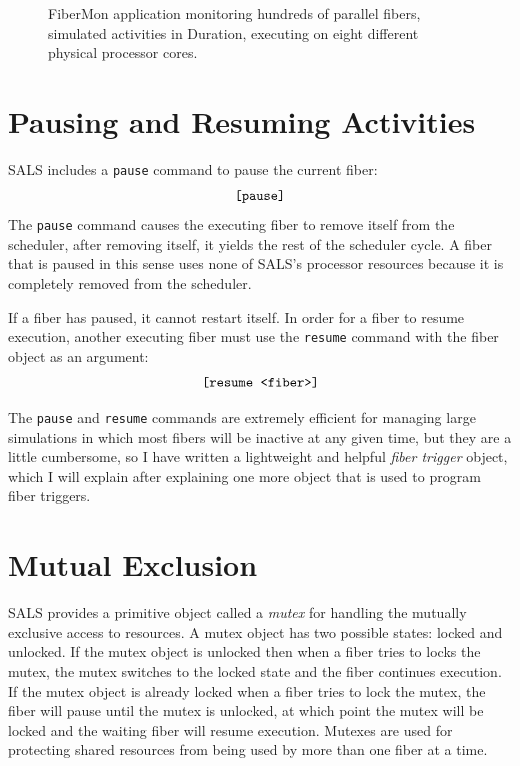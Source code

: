 \begin{figure}[bth]
  \caption[FiberMon application monitoring many fibers]{FiberMon
    application monitoring hundreds of parallel fibers, simulated
    activities in Duration, executing on eight different physical
    processor cores.}
  \label{figure:fibermon_many_fibers}
\end{figure}

\section{Pausing and Resuming Activities}

SALS includes a {\tt pause} command to pause the current fiber:
\begin{equation*}
\text{\tt [pause]}
\end{equation*}
The {\tt pause} command causes the executing fiber to remove itself
from the scheduler, after removing itself, it yields the rest of the
scheduler cycle.  A fiber that is paused in this sense uses none of
SALS's processor resources because it is completely removed from
the scheduler.

If a fiber has paused, it cannot restart itself.  In order for a fiber
to resume execution, another executing fiber must use the
{\tt resume} command with the fiber object as an argument:
\begin{equation*}
\text{\tt [resume <fiber>]}
\end{equation*}

The {\tt pause} and {\tt resume} commands are extremely efficient for
managing large simulations in which most fibers will be inactive at
any given time, but they are a little cumbersome, so I have written a
lightweight and helpful \emph{fiber trigger} object, which I will
explain after explaining one more object that is used to program fiber
triggers.

\section{Mutual Exclusion}

SALS provides a primitive object called a \emph{mutex} for handling
the mutually exclusive access to resources.  A mutex object has two
possible states: locked and unlocked.  If the mutex object is unlocked
then when a fiber tries to locks the mutex, the mutex switches to the
locked state and the fiber continues execution.  If the mutex object
is already locked when a fiber tries to lock the mutex, the fiber will
pause until the mutex is unlocked, at which point the mutex will be
locked and the waiting fiber will resume execution.  Mutexes are used
for protecting shared resources from being used by more than one fiber
at a time.

